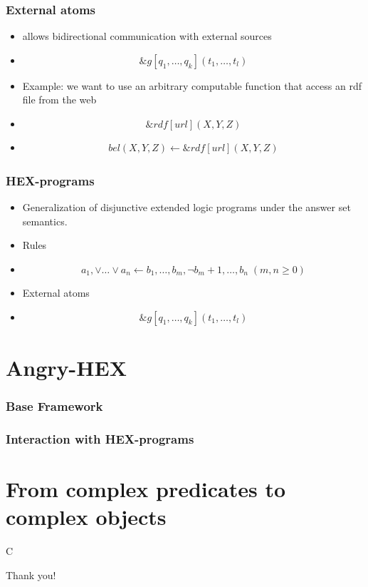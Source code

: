 \documentclass[smaller, dvipsnames]{beamer}
\newcommand{\ah}{Angry-HEX\xspace}
\begin{document}
\begin{frame}
    \frametitle{External atoms}
    \begin{itemize}
    	\item<1-> allows bidirectional communication with external sources
    	\item<2->[] \[ \&g[q_1,\dots,q_k](t_1,\dots,t_l) \]
    	\item<3-> Example: we want to use an arbitrary computable function that access an rdf file from the web
    	\item<4->[] \[ \&rdf[url](X,Y,Z) \]
    	\item<5->[] 
    		\begin{align*}
				bel(X,Y,Z) \leftarrow \&rdf[url](X,Y,Z)
    		\end{align*}
    \end{itemize}
\end{frame}

\begin{frame}
    \frametitle{HEX-programs}
    \begin{itemize}
    	\item<1-> Generalization of disjunctive extended logic programs under the answer set semantics.
    	\item<2-> Rules
    	\item<2->[] \[ a_1, \lor \dots \lor a_n \leftarrow b_1, \dots , b_m, \neg b_m+1, \dots, b_n \; (m,n \geq 0)\]
    	\item<3-> External atoms
    	\item<3->[] \[ \&g[q_1,\dots,q_k](t_1,\dots,t_l) \]
    \end{itemize}
\end{frame}

\section{\ah}

\begin{frame}
    \frametitle{Base Framework}
\end{frame}

\begin{frame}
    \frametitle{Interaction with HEX-programs}
\end{frame}

\section{From complex predicates to complex objects}

\begin{frame}
    C
\end{frame}

\begin{frame}[standout]
    Thank you!
\end{frame}
\end{document}
